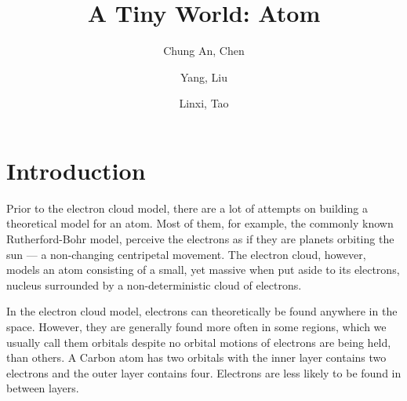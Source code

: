 \documentclass[acmtog]{acmart}
\begin{document}
\title{A Tiny World: Atom}

\author{Chung An, Chen}
\author{Yang, Liu}
\author{Linxi, Tao}





\maketitle

\section{Introduction}
Prior to the electron cloud model, there are a lot of attempts on building a theoretical model for an atom. Most of them, for example, the commonly known Rutherford-Bohr model, perceive the electrons as if they are planets orbiting the sun --- a non-changing centripetal movement. The electron cloud, however, models an atom consisting of a small, yet massive when put aside to its electrons, nucleus surrounded by a non-deterministic cloud of electrons.

In the electron cloud model, electrons can theoretically be found anywhere in the space. However, they are generally found more often in some regions, which we usually call them orbitals despite no orbital motions of electrons are being held, than others. A Carbon atom has two orbitals with the inner layer contains two electrons and the outer layer contains four. Electrons are less likely to be found in between layers.
\end{document}
